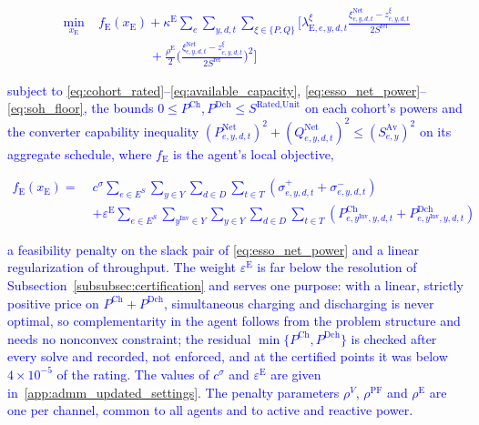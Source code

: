 \documentclass[preprint,12pt]{elsarticle}
\begin{document}
\textcolor{blue}{
    \begin{equation}
        \begin{aligned}
            \min_{x_{\text{E}}} \;
            & f_{\text{E}}(x_{\text{E}})
            + \kappa^{\text{E}} \sum_{e} \sum_{y,d,t} \sum_{\xi \in \{P,Q\}} \Big[
                \lambda^{\xi}_{\text{E},e,y,d,t} \frac{\xi^{\text{Net}}_{e,y,d,t} - z^{\xi}_{e,y,d,t}}{2 S^{\text{ref}}} \\
            & \qquad\qquad
                + \frac{\rho^{\text{E}}}{2} \Big( \frac{\xi^{\text{Net}}_{e,y,d,t} - z^{\xi}_{e,y,d,t}}{2 S^{\text{ref}}} \Big)^2
              \Big]
        \end{aligned}
        \label{eq:admm_esso_local}
    \end{equation}
}

\noindent
\textcolor{blue}{
    subject to \eqref{eq:cohort_rated}--\eqref{eq:available_capacity}, \eqref{eq:esso_net_power}--\eqref{eq:soh_floor}, the bounds $0 \le P^{\text{Ch}}, P^{\text{Dch}} \le S^{\text{Rated,Unit}}$ on each cohort's powers and the converter capability inequality $(P^{\text{Net}}_{e,y,d,t})^2 + (Q^{\text{Net}}_{e,y,d,t})^2 \le (S^{\text{Av}}_{e,y})^2$ on its aggregate schedule, where $f_{\text{E}}$ is the agent's local objective,
}

\textcolor{blue}{
    \begin{equation}
        \begin{aligned}
            f_{\text{E}}(x_{\text{E}}) = \;
            & c^{\sigma} \sum_{e \in E^S} \sum_{y \in Y} \sum_{d \in D} \sum_{t \in T}
            \left( \sigma^{+}_{e,y,d,t} + \sigma^{-}_{e,y,d,t} \right)\\
            & + \varepsilon^{\text{E}} \sum_{e \in E^S} \sum_{y^\text{Inv} \in Y} \sum_{y \in Y} \sum_{d \in D} \sum_{t \in T}
            \left( P^{\text{Ch}}_{e,y^\text{Inv},y,d,t} + P^{\text{Dch}}_{e,y^\text{Inv},y,d,t} \right)
        \end{aligned}
        \label{eq:esso_objective}
    \end{equation}
}

\noindent
\textcolor{blue}{
    a feasibility penalty on the slack pair of \eqref{eq:esso_net_power} and a linear regularization of throughput. The weight $\varepsilon^{\text{E}}$ is far below the resolution of Subsection~\ref{subsubsec:certification} and serves one purpose: with a linear, strictly positive price on $P^{\text{Ch}} + P^{\text{Dch}}$, simultaneous charging and discharging is never optimal, so complementarity in the agent follows from the problem structure and needs no nonconvex constraint; the residual $\min\{P^{\text{Ch}}, P^{\text{Dch}}\}$ is checked after every solve and recorded, not enforced, and at the certified points it was below $4 \times 10^{-5}$ of the rating. 
    The values of $c^{\sigma}$ and $\varepsilon^{\text{E}}$ are given in~\ref{app:admm_updated_settings}.
    The penalty parameters $\rho^{V}$, $\rho^{\text{PF}}$ and $\rho^{\text{E}}$ are one per channel, common to all agents and to active and reactive power.
}
\end{document}
